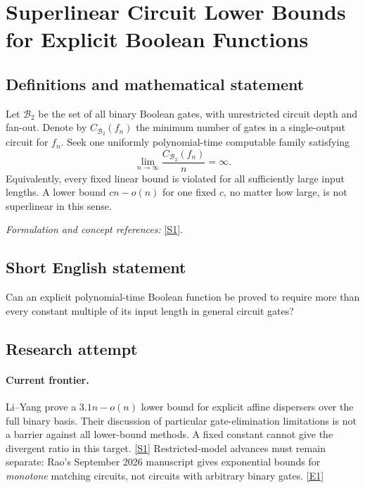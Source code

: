 \documentclass[11pt,a4paper]{article}
\newcommand{\sref}[2]{\hyperlink{source:#1:#2}{[S#2]}}
\newcommand{\eref}[2]{\hyperlink{extra:#1:#2}{[E#2]}}
\newif\ifshowcatalogue
\newcommand{\cataloguescope}[1]{\ifshowcatalogue
 \paragraph{Exact scope in the supplied catalogue.}
 \begin{quote}\small #1\end{quote}\fi}
\numberwithin{equation}{section}
\begin{document}
\setcounter{section}{0}
\clearpage
\section*{\texorpdfstring{Superlinear Circuit Lower Bounds for Explicit Boolean Functions}{Superlinear Circuit Lower Bounds for Explicit Boolean Functions}}\label{statement}
\subsection{Definitions and mathematical statement}
Let $\mathcal B_2$ be the set of all binary Boolean gates, with unrestricted circuit depth and fan-out. Denote by $C_{\mathcal B_2}(f_n)$ the minimum number of gates in a single-output circuit for $f_n$. Seek one uniformly polynomial-time computable family satisfying
\[
 \lim_{n\to\infty}\frac{C_{\mathcal B_2}(f_n)}{n}=\infty.
\]
Equivalently, every fixed linear bound is violated for all sufficiently large input lengths. A lower bound $cn-o(n)$ for one fixed $c$, no matter how large, is not superlinear in this sense.
\par\smallskip\textit{Formulation and concept references:} \sref{statement}{1}.
\cataloguescope{There exists a Boolean function family f\_n:\{0,1\}\textasciicircum{}n->\{0,1\}, n>=1, evaluated by a single deterministic polynomial-time algorithm on (1\textasciicircum{}n,x), whose minimum gate count C\_B2(f\_n) over single-output fan-in-two circuits using arbitrary binary Boolean gates satisfies C\_B2(f\_n)=omega(n): for every c>0 there is N such that C\_B2(f\_n)>c*n for every n>=N. The circuits have unrestricted depth and fan-out; no fixed linear constant counts as superlinear.}
\subsection{Short English statement}
Can an explicit polynomial-time Boolean function be proved to require more than every constant multiple of its input length in general circuit gates?
\subsection{Research attempt}

\paragraph{Current frontier.}
Li--Yang prove a $3.1n-o(n)$ lower bound for explicit affine dispersers over
the full binary basis. Their discussion of particular gate-elimination
limitations is not a barrier against all lower-bound methods. A fixed
constant cannot give the divergent ratio in this target. \sref{statement}{1}
Restricted-model advances must remain separate: Rao's September 2026
manuscript gives exponential bounds for \emph{monotone} matching circuits,
not circuits with arbitrary binary gates. \eref{statement}{1}
\end{document}
